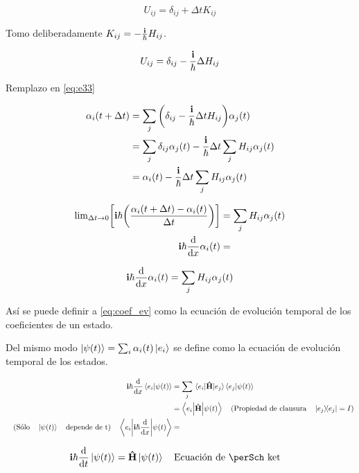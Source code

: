 \[
    U_{ij}=\delta_{ij}+\Delta t K_{ij}
\]

Tomo deliberadamente $K_{ij}=-\frac{\vb{i}}{\hbar}H_{ij}$.

\begin{equation}
\centering
   U_{ij}=\delta_{ij}-\frac{\vb{i}}{\hbar}\Delta H_{ij}
   \label{eq:e34}
\end{equation}

Remplazo en \autoref{eq:e33}

\begin{align*}
    \alpha_i(t+\Delta t)&=\sum_j \qty(\delta_{ij}-\frac{\vb{i}}{\hbar}\Delta t H_{ij})\alpha_j(t)\\
    &=\sum_j\delta_{ij}\alpha_j(t)-\frac{\vb{i}}{\hbar}\Delta t\sum_j H_{ij}\alpha_j(t)\\
    &=\alpha_i(t)-\frac{\vb{i}}{\hbar}\Delta t\sum_j H_{ij}\alpha_j(t)
\end{align*}



\begin{align*}
    \text{lim}_{\Delta t\rightarrow 0} \qty[\vb{i}\hbar\qty(\frac{\alpha_i(t+\Delta t)-\alpha_i(t)}{\Delta t})]&=\sum_j H_{ij}\alpha_j(t)  \\
    \vb{i}\hbar \dv{x} \alpha_i(t)&=
\end{align*}

\begin{equation}
    \vb{i}\hbar \dv{x} \alpha_i(t)=\sum_j H_{ij}\alpha_j(t) 
    \label{eq:coef_ev}
\end{equation}

Así se puede definir a \autoref{eq:coef_ev} como la ecuación de evolución temporal de los coeficientes de un estado.

Del mismo modo $\ket{\psi(t)}=\sum_i\alpha_i(t)\ket{e_i}$ se define como la ecuación de evolución temporal de los estados.

\begin{align*}
   \vb{i}\hbar \dv{x} \bra{e_i}\ket{\psi(t)}&=\sum_j\mel{e_i}{\vu{H}}{e_j}\bra{e_j}\ket{\psi(t)}\\
    &=\mel**{e_i}{\vu{H}}{\psi(t)}\qq{(Propiedad de clausura}\dyad{e_j}=I)\\
    \qq{(Sólo}\ket{\psi(t)}\qq{depende de t)} \mel**{e_i}{\vb{i}\hbar \dv{x}}{\psi(t)}&=
\end{align*}

\begin{equation}
\centering
   \vb{i}\hbar\dv{t}\ket{\psi(t)}=\vu{H}\ket{\psi(t)}\qq{Ecuación de \perSch ket}
   \label{eq:sch_ket}
\end{equation}

